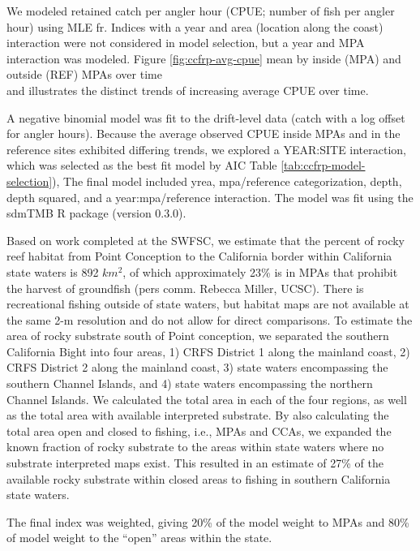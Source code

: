 \documentclass[11pt,
  english,
  letterpaper,
]{article}
\begin{document}
We modeled retained catch per angler hour (CPUE; number of fish per angler hour) using MLE fr. Indices with a year and area (location along the coast) interaction were not considered in model selection, but a year and MPA interaction was modeled. Figure \ref{fig:ccfrp-avg-cpue} mean by inside (MPA) and outside (REF) MPAs over time\\
and illustrates the distinct trends of increasing average CPUE over time.

A negative binomial model was fit to the drift-level data (catch with a log offset for angler hours). Because the average observed CPUE inside MPAs and in the reference sites exhibited differing trends, we explored a YEAR:SITE interaction, which was selected as the best fit model by AIC Table \ref{tab:ccfrp-model-selection}), The final model included yrea, mpa/reference categorization, depth, depth squared, and a year:mpa/reference interaction. The model was fit using the sdmTMB R package (version 0.3.0).

Based on work completed at the SWFSC, we estimate that the percent of rocky reef habitat from Point Conception to the California border within California state waters is 892 \(km^2\), of which approximately 23\% is in MPAs that prohibit the harvest of groundfish (pers comm. Rebecca Miller, UCSC). There is recreational fishing outside of state waters, but habitat maps are not available at the same 2-m resolution and do not allow for direct comparisons. To estimate the area of rocky substrate south of Point conception, we separated the southern California Bight into four areas, 1) CRFS District 1 along the mainland coast, 2) CRFS District 2 along the mainland coast, 3) state waters encompassing the southern Channel Islands, and 4) state waters encompassing the northern Channel Islands. We calculated the total area in each of the four regions, as well as the total area with available interpreted substrate. By also calculating the total area open and closed to fishing, i.e., MPAs and CCAs, we expanded the known fraction of rocky substrate to the areas within state waters where no substrate interpreted maps exist. This resulted in an estimate of 27\% of the available rocky substrate within closed areas to fishing in southern California state waters.

The final index was weighted, giving 20\% of the model weight to MPAs and 80\% of model weight to the ``open'' areas within the state.

\begingroup\fontsize{7}{9}\selectfont
\end{document}
